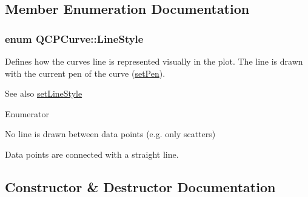 \subsection{Member Enumeration Documentation}
\subsubsection[{\texorpdfstring{Line\+Style}{LineStyle}}]{\setlength{\rightskip}{0pt plus 5cm}enum {\bf Q\+C\+P\+Curve\+::\+Line\+Style}}\hypertarget{classQCPCurve_a2710e9f79302152cff794c6e16cc01f1}{}\label{classQCPCurve_a2710e9f79302152cff794c6e16cc01f1}
Defines how the curve\textquotesingle{}s line is represented visually in the plot. The line is drawn with the current pen of the curve (\hyperlink{classQCPAbstractPlottable_ab74b09ae4c0e7e13142fe4b5bf46cac7}{set\+Pen}). \begin{DoxySeeAlso}{See also}
\hyperlink{classQCPCurve_a4a377ec863ff81a1875c3094a6177c19}{set\+Line\+Style} 
\end{DoxySeeAlso}
\begin{Desc}
\item[Enumerator]\par
\begin{description}
\item[{\em 
ls\+None\hypertarget{classQCPCurve_a2710e9f79302152cff794c6e16cc01f1aec1601a191cdf0b4e761c4c66092cc48}{}\label{classQCPCurve_a2710e9f79302152cff794c6e16cc01f1aec1601a191cdf0b4e761c4c66092cc48}
}]No line is drawn between data points (e.\+g. only scatters) \item[{\em 
ls\+Line\hypertarget{classQCPCurve_a2710e9f79302152cff794c6e16cc01f1ade5822ce6fbf131d3df131795c2e1003}{}\label{classQCPCurve_a2710e9f79302152cff794c6e16cc01f1ade5822ce6fbf131d3df131795c2e1003}
}]Data points are connected with a straight line. \end{description}
\end{Desc}


\subsection{Constructor \& Destructor Documentation}
